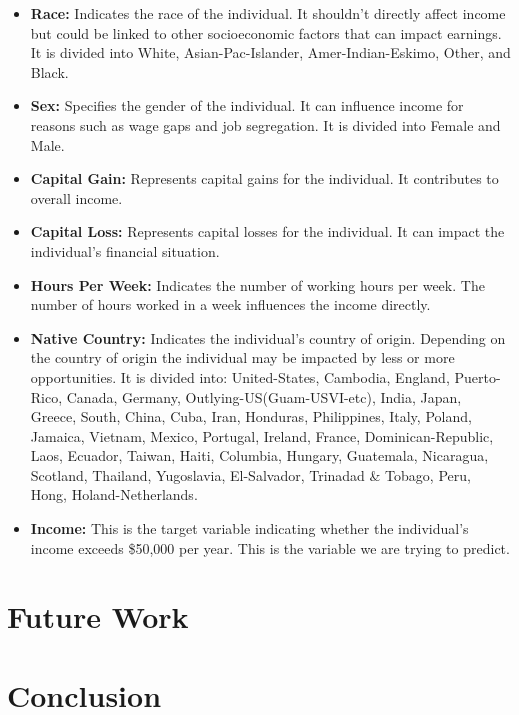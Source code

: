\documentclass[10pt,journal,compsoc]{IEEEtran}
\begin{document}
\begin{itemize}
    \item \textbf{Race:} Indicates the race of the individual. It shouldn't directly affect income but could be linked to other socioeconomic factors that can impact earnings. It is divided into White, Asian-Pac-Islander, Amer-Indian-Eskimo, Other, and Black.

    \item \textbf{Sex:} Specifies the gender of the individual. It can influence income for reasons such as wage gaps and job segregation. It is divided into Female and Male.

    \item \textbf{Capital Gain:} Represents capital gains for the individual. It contributes to overall income.
    
    \item \textbf{Capital Loss:} Represents capital losses for the individual. It can impact the individual's financial situation.
    
    \item \textbf{Hours Per Week:} Indicates the number of working hours per week. The number of hours worked in a week influences the income directly.

    \item \textbf{Native Country:} Indicates the individual's country of origin. Depending on the country of origin the individual may be impacted by less or more opportunities. It is divided into: United-States, Cambodia, England, Puerto-Rico, Canada, Germany, Outlying-US(Guam-USVI-etc), India, Japan, Greece, South, China, Cuba, Iran, Honduras, Philippines, Italy, Poland, Jamaica, Vietnam, Mexico, Portugal, Ireland, France, Dominican-Republic, Laos, Ecuador, Taiwan, Haiti, Columbia, Hungary, Guatemala, Nicaragua, Scotland, Thailand, Yugoslavia, El-Salvador, Trinadad \& Tobago, Peru, Hong, Holand-Netherlands.
    
    \item \textbf{Income:} This is the target variable indicating whether the individual's income exceeds  \$50,000 per year. This is the variable we are trying to predict.
    
\end{itemize}




\section{Future Work}


\section{Conclusion}


\appendices



\section{}


\printbibliography
\end{document}
